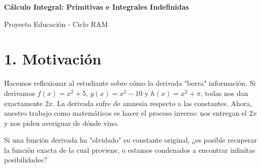 \documentclass[11pt]{article}
\newenvironment{motivacion}{\section*{1. Motivación}}{}
\newenvironment{preguntaguia}{\begin{tcolorbox}[colback=cyan!5,colframe=cyan!75!black,title=Pregunta Guía]}{\end{tcolorbox}}
\begin{document}
\begin{center}
  {\Large \textbf{Cálculo Integral: Primitivas e Integrales Indefinidas}}\par
  \vspace{0.5em}
  {\normalsize Proyecto Educación - Ciclo RAM}\par
  \vspace{1em}
\end{center}

\begin{motivacion}
  Hacemos reflexionar al estudiante sobre cómo la derivada "borra" información. Si derivamos $f(x) = x^2 + 5$, $g(x) = x^2 - 10$ y $h(x) = x^2 + \pi$, todas nos dan exactamente $2x$. La derivada sufre de amnesia respecto a las constantes. Ahora, nuestro trabajo como matemáticos es hacer el proceso inverso: nos entregan el $2x$ y nos piden averiguar de dónde vino.

  \begin{preguntaguia}
    Si una función derivada ha "olvidado" su constante original, ¿es posible recuperar la función exacta de la cual proviene, o estamos condenados a encontrar infinitas posibilidades?
  \end{preguntaguia}
\end{motivacion}
\end{document}
